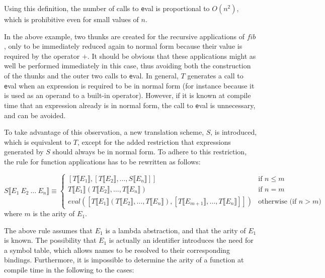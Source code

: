 Using this definition, the number of calls to {\texttt eval} is proportional to
$O(n^2)$, which is prohibitive even for small values of $n$.


In the above example, two thunks are created for the recursive applications of
$fib$, only to be immediately reduced again to normal form because their value
is required by the operator $+$. It should be obvious that these applications
might as well be performed immediately in this case, thus avoiding both the
construction of the thunks and the outer two calls to {\texttt eval}. In
general, $T$ generates a call to {\texttt eval} when an expression is required
to be in normal form (for instance because it is used as an operand to a
built-in operator). However, if it is known at compile time that an expression
already is in normal form, the call to {\texttt eval} is unnecessary, and can
be avoided.

To take advantage of this observation, a new translation scheme, $S$, is
introduced, which is equivalent to $T$, except for the added restriction that
expressions generated by $S$ should always be in normal form. To adhere to this
restriction, the rule for function applications has to be rewritten as follows:

\begin{equation*}
S \llbracket E_1 \: E_2 \: \ldots \: E_n \rrbracket \equiv
\begin{cases}
[T \llbracket E_1 \rrbracket, [T \llbracket E_2 \rrbracket,
                               \ldots,
                               S \llbracket E_n \rrbracket]] &
        \text{if $n \le m$} \\
T \llbracket E_1 \rrbracket(T \llbracket E_2 \rrbracket,
                            \ldots,
                            T \llbracket E_n \rrbracket) &
        \text{if $n = m$} \\
eval([ T \llbracket E_1 \rrbracket(T \llbracket E_2 \rrbracket,
                                   \ldots,
                                   T \llbracket E_n \rrbracket),
                        [T \llbracket E_{m+1} \rrbracket,
                         \ldots,
                         T \llbracket E_n \rrbracket]]) &
        \text{otherwise (if $n > m$)}
\end{cases}
\end{equation*}
where $m$ is the arity of $E_1$.

The above rule assumes that $E_1$ is a lambda abstraction, and that the arity of
$E_1$ is known. The possibility that $E_1$ is actually an identifier introduces
the need for a symbol table, which allows names to be resolved to their
corresponding bindings. Furthermore, it is impossible to determine the arity of
a function at compile time in the following to the cases:

